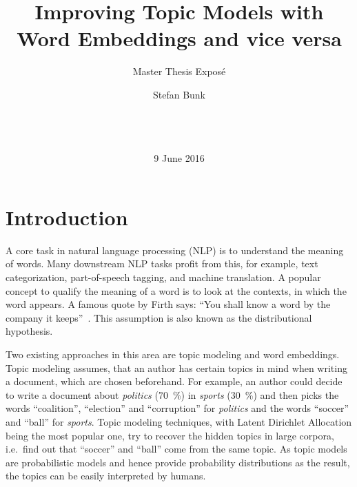 \documentclass{sig-alternate-05-2015}
\begin{document}
\title{Improving Topic Models with Word Embeddings and vice versa}
\subtitle{Master Thesis Expos\'e}

\author{
\alignauthor
Stefan Bunk\\
       \\
       \\
       \\
}
\date{9 June 2016}

\maketitle

\section{Introduction}
A core task in natural language processing (NLP) is to understand the meaning of words.
Many downstream NLP tasks profit from this, for example, text categorization, part-of-speech tagging, and machine translation.
A popular concept to qualify the meaning of a word is to look at the contexts, in which the word appears.
A famous quote by Firth says: ``You shall know a word by the company it keeps''~\cite{Firth1957}.
This assumption is also known as the distributional hypothesis.

Two existing approaches in this area are topic modeling and word embeddings.
Topic modeling assumes, that an author has certain topics in mind when writing a document, which are chosen beforehand.
For example, an author could decide to write a document about \emph{politics} (70~\%) in \emph{sports} (30~\%) and then picks the words ``coalition'', ``election'' and ``corruption'' for \emph{politics} and the words ``soccer'' and ``ball'' for \emph{sports}.
Topic modeling techniques, with Latent Dirichlet Allocation being the most popular one, try to recover the hidden topics in large corpora, i.e.\ find out that ``soccer'' and ``ball'' come from the same topic.
As topic models are probabilistic models and hence provide probability distributions as the result, the topics can be easily interpreted by humans.
\end{document}
